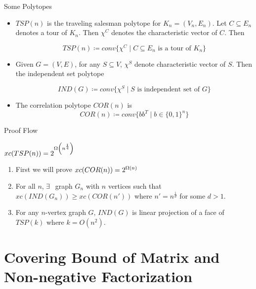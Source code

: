 \documentclass[aspectratio=1610]{beamer}
\begin{document}
\begin{frame}{Some Polytopes}

	\begin{itemize}
		\item $TSP(n)$ is the traveling salesman polytope for $K_n=(V_n,E_n)$. Let $C\subseteq E_n$ denotes a tour of $K_n$. Then $\chi^C$ denotes the characteristic vector of $C$. Then \pause

		      $$TSP(n)\coloneqq conv\{\chi^C\mid C\subseteq E_n\text{ is a tour of $K_n$}\}$$\pause

		\item Given $G=(V,E)$, for any $S\subseteq V$, $\chi^S$ denote characteristic vector of $S$. Then the independent set polytope\pause

		      $$IND(G)\coloneqq conv\{\chi^S\mid S\text{ is independent set of $G$}\}$$
		\item The correlation polytope $COR(n)$ is $$COR(n)\coloneqq conv\{bb^T\mid b\in\{0,1\}^n\}$$
	\end{itemize}
\end{frame}
\begin{frame}{Proof Flow}
	\begin{theorem}
		$xc(TSP(n))=2^{\Omega\left(n^{\frac14}\right)}$
	\end{theorem}\pause

	\begin{enumerate}[label=Step \arabic*:]
		\item First we will prove $xc(COR(n))=2^{\Omega(n)}$\pause \vspace*{5mm}

		\item For all $n$, $\exists\ $ graph $G_n$ with $n$ vertices such that $xc(IND(G_n))\geq xc(COR(n'))$ where $n'=n^{\frac1d}$ for some $d>1$.\pause\vspace*{5mm}

		\item For any $n$-vertex graph $G$, $IND(G)$ is linear projection of a face of $TSP(k)$ where $k=O(n^2)$.
	\end{enumerate}
\end{frame}

\section{Covering Bound of Matrix and Non-negative Factorization}
\end{document}
